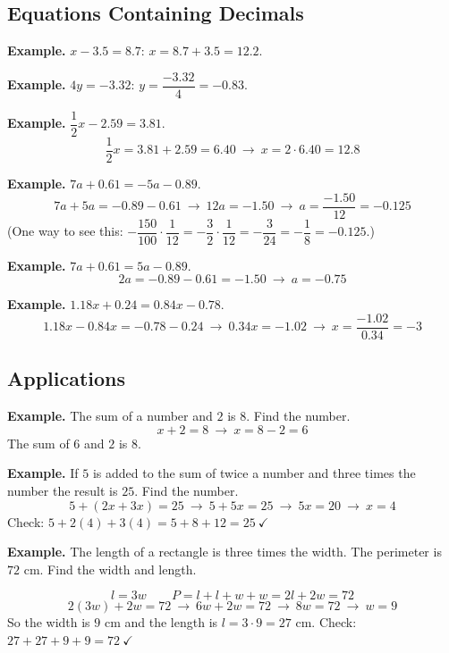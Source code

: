 \documentclass[letter]{article}
\begin{document}
\subsection{Equations Containing Decimals}

\textbf{Example.} $x-3.5=8.7$: $x=8.7+3.5=12.2$.

\textbf{Example.} $4y=-3.32$: $y=\dfrac{-3.32}4=-0.83$.

\textbf{Example.} $\dfrac12x-2.59=3.81$.
\[\frac12x=3.81+2.59=6.40\ \to\ x=2\cdot6.40=12.8\]

\textbf{Example.} $7a+0.61=-5a-0.89$.
\[7a+5a=-0.89-0.61\ \to\ 12a=-1.50\ \to\ a=\frac{-1.50}{12}=-0.125\]
(One way to see this: $-\dfrac{150}{100}\cdot\dfrac1{12}=-\dfrac32\cdot\dfrac1{12}=-\dfrac3{24}=-\dfrac18=-0.125$.)

\textbf{Example.} $7a+0.61=5a-0.89$.
\[2a=-0.89-0.61=-1.50\ \to\ a=-0.75\]

\textbf{Example.} $1.18x+0.24=0.84x-0.78$.
\[1.18x-0.84x=-0.78-0.24\ \to\ 0.34x=-1.02\ \to\ x=\frac{-1.02}{0.34}=-3\]

\subsection{Applications}

\textbf{Example.} The sum of a number and $2$ is $8$. Find the number.
\[x+2=8\ \to\ x=8-2=6\]
The sum of $6$ and $2$ is $8$.

\textbf{Example.} If $5$ is added to the sum of twice a number and three times the number the result is $25$. Find the number.
\[5+(2x+3x)=25\ \to\ 5+5x=25\ \to\ 5x=20\ \to\ x=4\]
Check: $5+2(4)+3(4)=5+8+12=25\ \checkmark$

\textbf{Example.} The length of a rectangle is three times the width. The perimeter is $72$ cm. Find the width and length.

\begin{center}
\end{center}
\[l=3w\qquad P=l+l+w+w=2l+2w=72\]
\[2(3w)+2w=72\ \to\ 6w+2w=72\ \to\ 8w=72\ \to\ w=9\]
So the width is $9$ cm and the length is $l=3\cdot9=27$ cm. Check: $27+27+9+9=72\ \checkmark$
\end{document}
